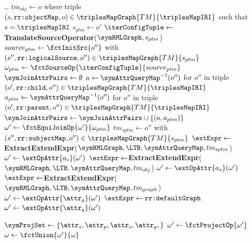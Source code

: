 \begin{algorithm}[htbp]
	\caption{RML translation to algebraic mapping expressions Part 2}
	\label{alg:rml2algebra_part2}
	\begin{algorithmic}[1]
		\State \dots
            \State $tm_{obj} \gets o$ where triple $(s,\texttt{rr:objectMap},o) \in \triplesMapGraph{TM}{\triplesMapIRI}$ such that $s = \triplesMapIRI$ 
		        \State $s_{ptm} \gets o'$
		        \State  $\iterConfigTuple \gets $ \textbf{TranslateSourceOperator}($\symRMLGraph, s_{ptm}$) 
                \State   $source_{ptm} \gets \fctInitSrc{o''}$ with $(s'',\texttt{rr:logicalSource},o'') \in \triplesMapGraph{TM}{s_{ptm}}$ 
		        \State  $\omega_{ptm} \gets \fctSourceOp{\iterConfigTuple}{source_{ptm}}$
                \State $\symJoinAttrPairs \gets \emptyset$
                    \State  $a \gets \symAttrQueryMap^{-1}(o'') $ for $o''$ in triple $(o',\texttt{rr:child},o'') \in \triplesMapGraph{TM}{\triplesMapIRI}$
                    \State  $a_{ptm} \gets \symAttrQueryMap^{-1}(o'')$ for $o''$ in triple $(o',\texttt{rr:parent},o'') \in \triplesMapGraph{TM}{\triplesMapIRI}$
		            \State  $\symJoinAttrPairs \gets \symJoinAttrPairs \cup \{ (a, a_{ptm}) \}$
                \EndFor
                \If {$\symJoinAttrPairs  \neq \emptyset$ }
		            \State  $\omega' \gets \fctEquiJoinOp{\omega'}{\omega_{ptm}}$
                \EndIf
                \State $tm_{sptm} \gets  o''$ with $(s'',\texttt{rr:subjectMap},o'') \in \triplesMapGraph{TM}{s_{ptm}}$ 
                \State $\extExpr \gets $\textbf{ExtractExtendExpr}($\symRMLGraph, \LTB, \symAttrQueryMap, tm_{sptm}$)
                \State  $\omega' \gets \extOpAttr{a_{o}}(\omega')$
            \Else
                \State $\extExpr \gets $\textbf{ExtractExtendExpr}($\symRMLGraph, \LTB, \symAttrQueryMap, tm_{obj}$)
                \State  $\omega' \gets \extOpAttr{a_{o}}(\omega')$
		    \EndIf
            \Statex
                \State $\extExpr \gets $\textbf{ExtractExtendExpr}($\symRMLGraph, \LTB, \symAttrQueryMap, tm_{graph}$) 
                \State $\omega' \gets \extOpAttr{\attr_{g}}(\omega')$
            \Else
                \State $\extExpr \gets \texttt{rr:defaultGraph}$
                \State $\omega' \gets \extOpAttr{\attr_{g}}(\omega')$
            \EndIf

            \Statex
            \State $\symProjSet \gets \{\attr_{s},\attr_{p},\attr_{o},\attr_{g},\}$
            \State $\omega' \gets \fctProjectOp{\omega'}$
            \State $\omega \gets  \fctUnion{\omega'}{\omega}$
		\EndFor
	\end{algorithmic}
\end{algorithm}


